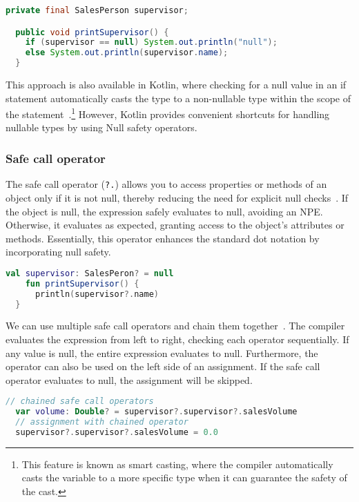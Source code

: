 \documentclass[a4paper, 11pt]{article}
\begin{document}
\begin{lstlisting}[language=Java]
  private final SalesPerson supervisor;

  public void printSupervisor() {
    if (supervisor == null) System.out.println("null");
    else System.out.println(supervisor.name);
  }
\end{lstlisting}

This approach is also available in Kotlin, where checking for a null value in an if statement automatically casts the type to a non-nullable type within the scope of the statement~\cite{nullsafety-if-condition}.\footnote{This feature is known as smart casting, where the compiler automatically casts the variable to a more specific type when it can guarantee the safety of the cast.}
However, Kotlin provides convenient shortcuts for handling nullable types by using Null safety operators.

\subsubsection{Safe call operator}
The safe call operator (\texttt{?.}) allows you to access properties or methods of an object only if it is not null, thereby reducing the need for explicit null checks~\cite{nullsafety-safe-call}.
If the object is null, the expression safely evaluates to null, avoiding an NPE\@.
Otherwise, it evaluates as expected, granting access to the object's attributes or methods.
Essentially, this operator enhances the standard dot notation by incorporating null safety. 

\begin{lstlisting}[language=Kotlin]
  val supervisor: SalesPeron? = null
    fun printSupervisor() {
      println(supervisor?.name)
  }
\end{lstlisting}
  
  We can use multiple safe call operators and chain them together~\cite{nullsafety-safe-call}. The compiler evaluates the expression from left to right, checking each operator sequentially. If any value is null, the entire expression evaluates to null.
  Furthermore, the operator can also be used on the left side of an assignment. If the safe call operator evaluates to null, the assignment will be skipped.
  \begin{lstlisting}[language=Kotlin]
  // chained safe call operators
  var volume: Double? = supervisor?.supervisor?.salesVolume
  // assignment with chained operator
  supervisor?.supervisor?.salesVolume = 0.0
  \end{lstlisting}
\end{document}
